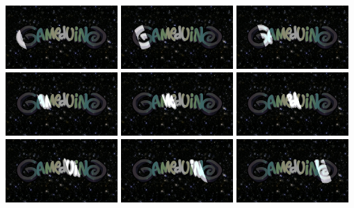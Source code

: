 \documentclass[10pt]{book}
\begin{document}
\begin{CJK}{UTF8}{gkai}
\begin{center}
\includegraphics[width=0.32\textwidth]{assets/slotgag/00.png}
\includegraphics[width=0.32\textwidth]{assets/slotgag/02.png}
\includegraphics[width=0.32\textwidth]{assets/slotgag/04.png}
\includegraphics[width=0.32\textwidth]{assets/slotgag/06.png}
\includegraphics[width=0.32\textwidth]{assets/slotgag/08.png}
\includegraphics[width=0.32\textwidth]{assets/slotgag/10.png}
\includegraphics[width=0.32\textwidth]{assets/slotgag/12.png}
\includegraphics[width=0.32\textwidth]{assets/slotgag/14.png}
\includegraphics[width=0.32\textwidth]{assets/slotgag/16.png}
\end{center}


\end{CJK}
\end{document}
